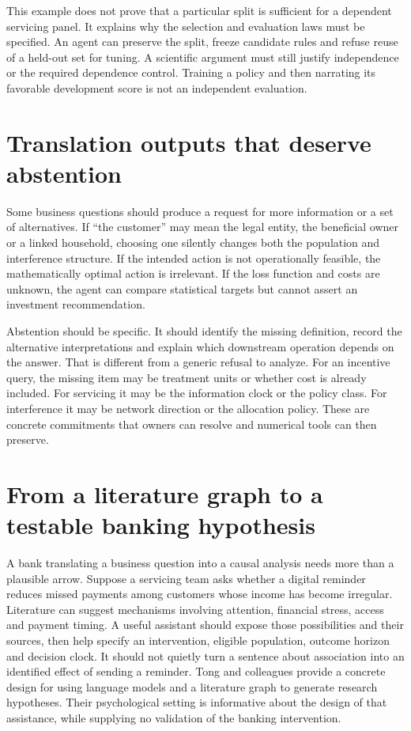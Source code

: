 This example does not prove that a particular split is sufficient for a
dependent servicing panel. It explains why the selection and evaluation laws
must be specified. An agent can preserve the split, freeze candidate rules and
refuse reuse of a held-out set for tuning. A scientific argument must still
justify independence or the required dependence control. Training a policy
and then narrating its favorable development score is not an independent
evaluation.

\section{Translation outputs that deserve abstention}

Some business questions should produce a request for more information or a set
of alternatives. If ``the customer'' may mean the legal entity, the beneficial
owner or a linked household, choosing one silently changes both the population
and interference structure. If the intended action is not operationally
feasible, the mathematically optimal action is irrelevant. If the loss function
and costs are unknown, the agent can compare statistical targets but cannot
assert an investment recommendation.

Abstention should be specific. It should identify the missing definition,
record the alternative interpretations and explain which downstream operation
depends on the answer. That is different from a generic refusal to analyze.
For an incentive query, the missing item may be treatment units or whether
cost is already included. For servicing it may be the information clock or
the policy class. For interference it may be network direction or the allocation
policy. These are concrete commitments that owners can resolve and numerical
tools can then preserve.


\section{From a literature graph to a testable banking hypothesis}
\label{exec20:hypothesis-scope}
A bank translating a business question into a causal analysis needs more than a plausible arrow. Suppose a servicing team asks whether a digital reminder reduces missed payments among customers whose income has become irregular. Literature can suggest mechanisms involving attention, financial stress, access and payment timing. A useful assistant should expose those possibilities and their sources, then help specify an intervention, eligible population, outcome horizon and decision clock. It should not quietly turn a sentence about association into an identified effect of sending a reminder. Tong and colleagues provide a concrete design for using language models and a literature graph to generate research hypotheses. Their psychological setting is informative about the design of that assistance, while supplying no validation of the banking intervention.~\citep{exec20_hypothesis_generation}

